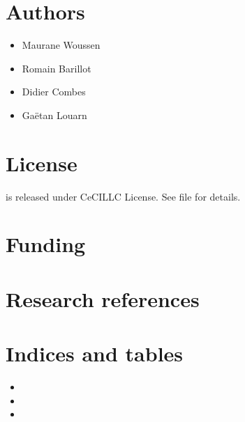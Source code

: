 \documentclass[letterpaper,10pt,english]{sphinxmanual}
\begin{document}
\chapter{Authors}
\label{\detokenize{index:authors}}\begin{itemize}
\item {} 
\sphinxAtStartPar
Maurane Woussen

\item {} 
\sphinxAtStartPar
Romain Barillot

\item {} 
\sphinxAtStartPar
Didier Combes

\item {} 
\sphinxAtStartPar
Gaëtan Louarn

\end{itemize}


\chapter{License}
\label{\detokenize{index:license}}
\sphinxAtStartPar
{\hyperref[\detokenize{index:module-lightvegemanager}]{}} is released under CeCILL\sphinxhyphen{}C License. See file  for details.


\chapter{Funding}
\label{\detokenize{index:funding}}

\chapter{Research references}
\label{\detokenize{index:research-references}}

\chapter{Indices and tables}
\label{\detokenize{index:indices-and-tables}}\begin{itemize}
\item {} 
\sphinxAtStartPar
{}

\item {} 
\sphinxAtStartPar
{}

\item {} 
\sphinxAtStartPar
{}

\end{itemize}
\end{document}
